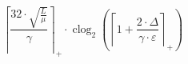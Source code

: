 \[\left\lceil \frac{32 \cdot \sqrt{\frac{L}{\mu}}}{\gamma} \right\rceil_{+} \cdot \operatorname{clog}_{2}\left(\left\lceil 1 + \frac{2 \cdot \Delta}{\gamma \cdot \varepsilon} \right\rceil_{+}\right)\]
